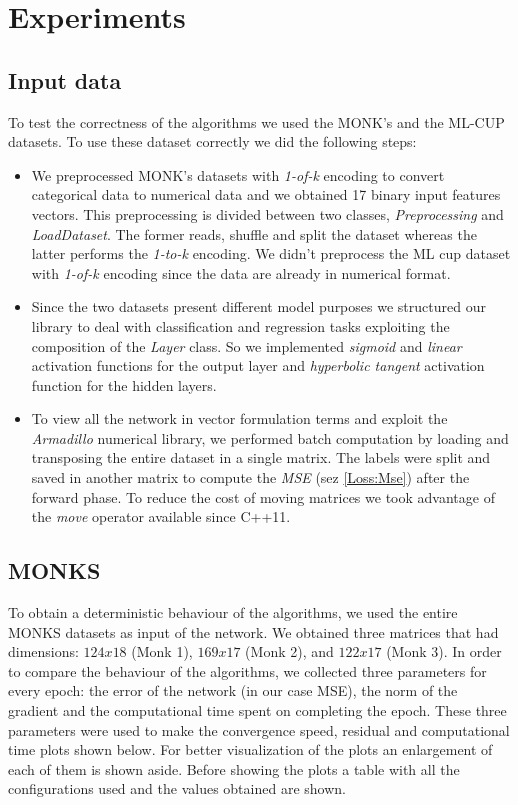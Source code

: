 \section{Experiments}

\subsection{Input data}
To test the correctness of the algorithms we used the MONK's and the ML-CUP datasets. To use these dataset correctly we did the following steps:
\begin{itemize}
	\item We preprocessed MONK's datasets with \textit{1-of-k} encoding to convert categorical data to numerical data and we obtained 17 binary input features vectors. This preprocessing is divided between two classes, \textit{Preprocessing} and \textit{LoadDataset}. The former reads, shuffle and split the dataset whereas the latter performs the \textit{1-to-k} encoding. We didn't preprocess the ML cup dataset with \textit{1-of-k} encoding since the data are already in numerical format.
	\item Since the two datasets present different model purposes we structured our library to deal with classification and regression tasks exploiting the composition of the \textit{Layer} class.  So we implemented \textit{sigmoid} and \textit{linear} activation functions for the output layer and \textit{hyperbolic tangent} activation function for the hidden layers.
	\item To view all the network in vector formulation terms and exploit the \textit{Armadillo} numerical library, we performed batch computation by loading and transposing the entire dataset in a single matrix. The labels were split and saved in another matrix to compute the \textit{MSE} (sez \ref{Loss:Mse}) after the forward phase. To reduce the cost of moving matrices we took advantage of the \textit{move} operator available since C++11. 
\end{itemize}


\subsection{MONKS} 
To obtain a deterministic behaviour of the algorithms, we used the entire MONKS datasets as input of the network. We obtained three matrices that had dimensions: $124x18$ (Monk 1), $169x17$ (Monk 2), and $122x17$ (Monk 3). In order to compare the behaviour of the algorithms, we collected three parameters for every epoch: the error of the network (in our case MSE), the norm of the gradient and the computational time spent on completing the epoch. These three parameters were used to make the convergence speed, residual and computational time plots shown below. For better visualization of the plots an enlargement of each of them is shown aside. Before showing the plots a table with all the configurations used and the values obtained are shown.

